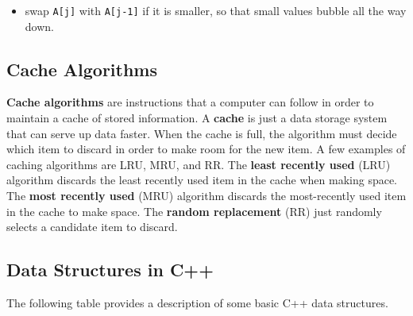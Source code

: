 \begin{itemize}
	\item swap \texttt{A[j]} with \texttt{A[j-1]} if it is smaller, so that small values bubble all the way down. 
\end{itemize}

\subsection{Cache Algorithms}

\textbf{Cache algorithms} are instructions that a computer can follow in order to maintain a cache of stored information. A \textbf{cache} is just a data storage system that can serve up data faster. When the cache is full, the algorithm must decide which item to discard in order to make room for the new item. A few examples of caching algorithms are LRU, MRU, and RR. The \textbf{least recently used} (LRU) algorithm discards the least recently used item in the cache when making space. The \textbf{most recently used} (MRU) algorithm discards the most-recently used item in the cache to make space. The \textbf{random replacement} (RR) just randomly selects a candidate item to discard. 

\subsection{Data Structures in C++}

The following table provides a description of some basic C++ data structures. 

